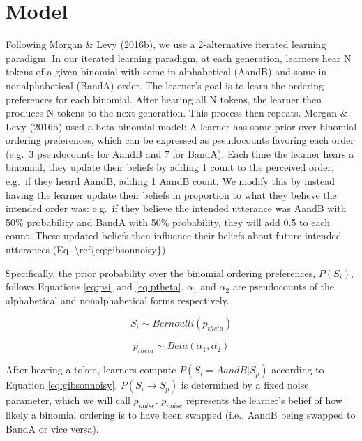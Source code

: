 \documentclass[10pt, letterpaper]{article}
\begin{document}
\hypertarget{model}{%
\section{Model}\label{model}}

Following Morgan \& Levy (2016b), we use a 2-alternative iterated
learning paradigm. In our iterated learning paradigm, at each
generation, learners hear N tokens of a given binomial with some in
alphabetical (AandB) and some in nonalphabetical (BandA) order. The
learner's goal is to learn the ordering preferences for each binomial.
After hearing all N tokens, the learner then produces N tokens to the
next generation. This process then repeats. Morgan \& Levy (2016b) used
a beta-binomial model: A learner has some prior over binomial ordering
preferences, which can be expressed as pseudocounts favoring each order
(e.g.~3 pseudocounts for AandB and 7 for BandA). Each time the learner
hears a binomial, they update their beliefs by adding 1 count to the
perceived order, e.g.~if they heard AandB, adding 1 AandB count. We
modify this by instead having the learner update their beliefs in
proportion to what they believe the intended order was: e.g.~if they
believe the intended utterance was AandB with 50\% probability and BandA
with 50\% probability, they will add 0.5 to each count. These updated
beliefs then influence their beliefs about future intended utterances
(Eq. \textbackslash ref\{eq:gibsonnoisy\}).

Specifically, the prior probability over the binomial ordering
preferences, \(P(S_i)\), follows Equations \ref{eq:psi} and
\ref{eq:ptheta}. \(\alpha_1\) and \(\alpha_2\) are pseudocounts of the
alphabetical and nonalphabetical forms respectively.

\begin{equation}
\label{eq:psi}
S_i \sim Bernoulli(p_{theta})
\end{equation}

\begin{equation}
\label{eq:ptheta}
p_{theta} \sim Beta(\alpha_1, \alpha_2)
\end{equation}

After hearing a token, learners compute \(P(S_i = AandB|S_p)\) according
to Equation \ref{eq:gibsonnoisy}. \(P(S_i \to S_p)\) is determined by a
fixed noise parameter, which we will call \(p_{noise}\). \(p_{noise}\)
represents the learner's belief of how likely a binomial ordering is to
have been swapped (i.e., AandB being swapped to BandA or vice versa).
\end{document}
